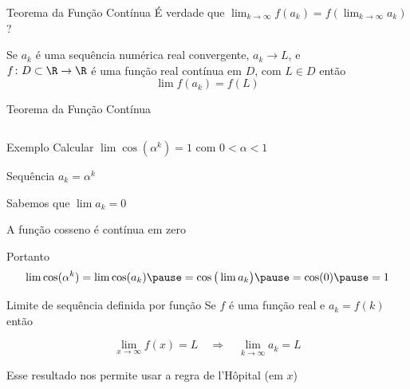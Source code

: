 \begin{frame}{Teorema da Função Contínua}
É verdade que \quad
\emph{\(
  \lim_{k\to \infty} f(a_k) = f\!\left(\lim_{k\to \infty} a_k\right)
\)} \quad?

\pause
\vspace{2\baselineskip}
Se $a_k$ é uma sequência numérica real convergente, $a_k\to L$, e\\[1mm]
$f\colon D\subset\R\to\R$ é uma função real contínua em $D$,
com $L\in D$
então
\[
  \lim f(a_k) = f(L)
\]
\end{frame}

\begin{frame}{Teorema da Função Contínua}
  \begin{columns}
    \centerline{\scalebox{0.8}{}} \pause
    \centerline{\scalebox{0.8}{}}
  \end{columns}
\end{frame}

\begin{frame}{Exemplo}
  Calcular \(\lim\cos(\alpha^k)=1\) com $0<\alpha<1$

  \pause
  \vspace{\baselineskip}
  \qquad Sequência \( a_k = \alpha^k\)

  \qquad Sabemos que \(\lim a_k=0\)

  \pause
  \qquad A função cosseno é contínua em zero

  \pause
  \vspace{0.5\baselineskip}
  Portanto
  \[
    \lim\cos(\alpha^k)
    = \lim\cos(a_k)
    \pause
    = \cos\big(\lim a_k\big)
    \pause
    = \cos(0)
    \pause
    = 1
  \]
\end{frame}

\begin{frame}{Limite de sequência definida por função}
    Se $f$ é uma função real e \(a_k=f(k)\) então

    \[
    	\lim_{x\to\infty} f(x) = L \quad \Rightarrow \quad
      \lim_{k\to\infty} a_k = L
    \]

    \pause
    \vspace{\baselineskip}
    Esse resultado nos permite usar a regra de l'Hôpital (em $x$)
\end{frame}

